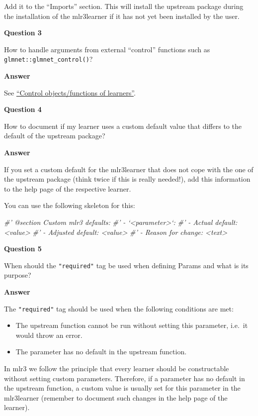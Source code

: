 \documentclass[]{scrbook}
\newenvironment{Shaded}{\begin{snugshade}}{\end{snugshade}}
\newcommand{\CommentTok}[1]{\textcolor[rgb]{0.56,0.35,0.01}{\textit{#1}}}
\providecommand{\tightlist}{%
  \setlength{\itemsep}{0pt}\setlength{\parskip}{0pt}}
\renewenvironment{Shaded} {\begin{snugshade}\small} {\end{snugshade}}
\begin{document}
Add it to the ``Imports'' section.
This will install the upstream package during the installation of the mlr3learner if it has not yet been installed by the user.

\textbf{Question 3}

How to handle arguments from external ``control'' functions such as \texttt{glmnet::glmnet\_control()}?

\textbf{Answer}

See \href{https://mlr3book.mlr-org.com/extending-learners.html\#learner-control}{``Control objects/functions of learners''}.

\textbf{Question 4}

How to document if my learner uses a custom default value that differs to the default of the upstream package?

\textbf{Answer}

If you set a custom default for the mlr3learner that does not cope with the one of the upstream package (think twice if this is really needed!), add this information to the help page of the respective learner.

You can use the following skeleton for this:

\begin{Shaded}
\begin{Highlighting}[]
\CommentTok{#' @section Custom mlr3 defaults:}
\CommentTok{#' - `<parameter>`:}
\CommentTok{#'   - Actual default: <value>}
\CommentTok{#'   - Adjusted default: <value>}
\CommentTok{#'   - Reason for change: <text>}
\end{Highlighting}
\end{Shaded}

\textbf{Question 5}

When should the \texttt{"required"} tag be used when defining Params and what is its purpose?

\textbf{Answer}

The \texttt{"required"} tag should be used when the following conditions are met:

\begin{itemize}
\tightlist
\item
  The upstream function cannot be run without setting this parameter, i.e.~it would throw an error.
\item
  The parameter has no default in the upstream function.
\end{itemize}

In mlr3 we follow the principle that every learner should be constructable without setting custom parameters.
Therefore, if a parameter has no default in the upstream function, a custom value is usually set for this parameter in the mlr3learner (remember to document such changes in the help page of the learner).
\end{document}
